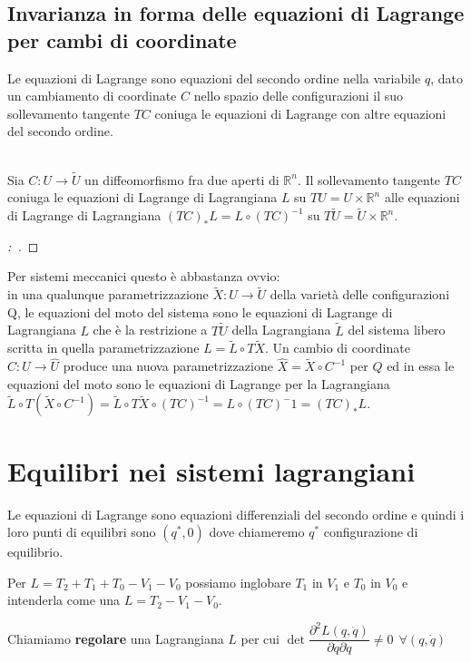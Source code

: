 \documentclass[11pt,a4paper,twoside]{book}
\newenvironment{proposizione}[1][\empty]{\begin{Proposizione}{
\ifx\empty#1\relax\else\mdseries\itshape#1\\\fi
}{}}{\end{Proposizione}}
\newenvironment{dimo}[1][\proofname]{
	\begin{tcolorbox}[
	breakable, 
	enhanced, 
	interior hidden, 
	frame hidden, 
	borderline west = {1pt}{0pt}{gray}, 
	top=0pt, bottom=0pt, left=0pt]
\begin{proof}[#1:~]
}
{
\end{proof}
\end{tcolorbox}
}
\theoremstyle{esss}
\theoremstyle{dotless}
\numberwithin{equation}{section} %
\begin{document}
\subsection{Invarianza in forma delle equazioni di Lagrange per cambi di coordinate}
Le equazioni di Lagrange sono equazioni del secondo ordine nella variabile $q$, dato un cambiamento di coordinate $C$ nello spazio delle configurazioni il suo sollevamento tangente $TC$ coniuga le equazioni di Lagrange con altre equazioni del secondo ordine.

\begin{proposizione}
Sia $C : U \rightarrow \tilde{U}$ un diffeomorfismo fra due aperti di $\mathbb{R}^n$.
Il sollevamento tangente $TC$ coniuga le equazioni di Lagrange di Lagrangiana $L$ su $TU = U\times\mathbb{R}^n$ alle equazioni di Lagrange di Lagrangiana $(TC)_* L = L \circ (TC)^{-1}$ su $T \tilde{U} = \tilde{U}\times\mathbb{R}^n$.
\end{proposizione}

\begin{dimo}
\end{dimo}

Per sistemi meccanici questo è abbastanza ovvio:\\
in una qualunque parametrizzazione $\tilde{X} : U\rightarrow\tilde{U}$ della varietà delle configurazioni Q, le equazioni del moto del sistema sono le equazioni di Lagrange di Lagrangiana $L$ che è la restrizione a $T\tilde{U}$ della Lagrangiana $\tilde{L}$ del sistema libero scritta in quella parametrizzazione $L = \tilde{L}\circ  T\tilde{X}$. Un cambio di coordinate $C: U\rightarrow \hat{U}$ produce una nuova parametrizzazione $\hat{X}=\tilde{X}\circ C^{-1}$ per $Q$ ed in essa le equazioni del moto sono le equazioni di Lagrange per la Lagrangiana $\tilde{L}\circ T(\tilde{X}\circ C^{-1})=\tilde{L}\circ T\tilde{X}\circ (TC)^{-1}=L\circ(TC)^-1=(TC)_*L$.

\section{Equilibri nei sistemi lagrangiani}
Le equazioni di Lagrange sono equazioni differenziali del secondo ordine e quindi i loro punti di equilibri sono $(q^*,0)$ dove chiameremo $q^*$ configurazione di equilibrio.

Per $L=T_2+T_1+T_0-V_1-V_0$ possiamo inglobare $T_1$ in $V_1$ e $T_0$ in $V_0$ e intenderla come una $L=T_2-V_1-V_0$.

Chiamiamo \textbf{regolare} una Lagrangiana $L$ per cui $ \det{ \dfrac{\partial^2 L (q,\dot{q})}{\partial \dot{q} \partial \dot{q} }  } \neq 0 \>\> \forall (q,\dot{q})$
\end{document}
